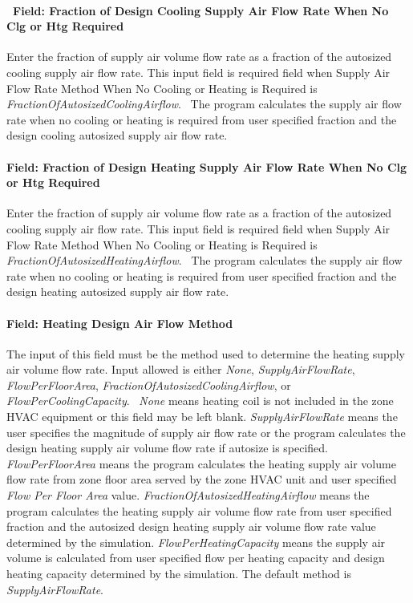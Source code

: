 \paragraph{~Field: Fraction of Design Cooling Supply Air Flow Rate When No Clg or Htg Required}\label{field-fraction-of-design-cooling-supply-air-flow-rate-when-no-clg-or-htg-required}

Enter the fraction of supply air volume flow rate as a fraction of the autosized cooling supply air flow rate. This input field is required field when Supply Air Flow Rate Method When No Cooling or Heating is Required is \emph{FractionOfAutosizedCoolingAirflow}.~ The program calculates the supply air flow rate when no cooling or heating is required from user specified fraction and the design cooling autosized supply air flow rate.

\paragraph{Field: Fraction of Design Heating Supply Air Flow Rate When No Clg or Htg Required}\label{field-fraction-of-design-heating-supply-air-flow-rate-when-no-clg-or-htg-required}

Enter the fraction of supply air volume flow rate as a fraction of the autosized cooling supply air flow rate. This input field is required field when Supply Air Flow Rate Method When No Cooling or Heating is Required is \emph{FractionOfAutosizedHeatingAirflow}.~ The program calculates the supply air flow rate when no cooling or heating is required from user specified fraction and the design heating autosized supply air flow rate.

\paragraph{Field: Heating Design Air Flow Method}\label{field-heating-design-air-flow-method-1}

The input of this field must be the method used to determine the heating supply air volume flow rate. Input allowed is either \emph{None}, \emph{SupplyAirFlowRate}, \emph{FlowPerFloorArea}, \emph{FractionOfAutosizedCoolingAirflow}, or \emph{FlowPerCoolingCapacity}.~ \emph{None} means heating coil is not included in the zone HVAC equipment or this field may be left blank. \emph{SupplyAirFlowRate} means the user specifies the magnitude of supply air flow rate or the program calculates the design heating supply air volume flow rate if autosize is specified. \emph{FlowPerFloorArea} means the program calculates the heating supply air volume flow rate from zone floor area served by the zone HVAC unit and user specified \emph{Flow Per Floor Area} value. \emph{FractionOfAutosizedHeatingAirflow} means the program calculates the heating supply air volume flow rate from user specified fraction and the autosized design heating supply air volume flow rate value determined by the simulation. \emph{FlowPerHeatingCapacity} means the supply air volume is calculated from user specified flow per heating capacity and design heating capacity determined by the simulation. The default method is \emph{SupplyAirFlowRate}.

